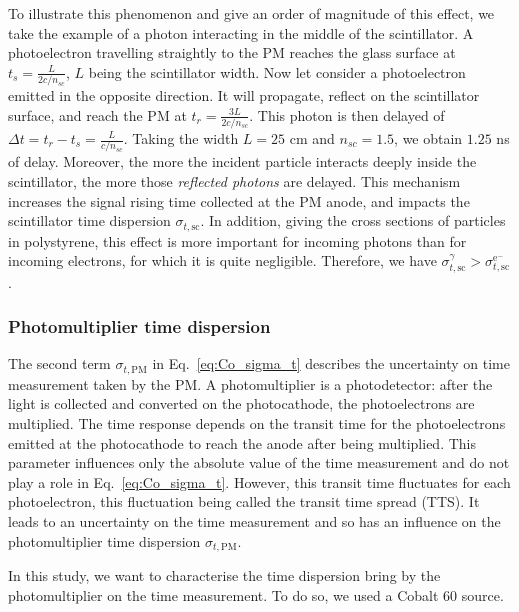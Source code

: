 To illustrate this phenomenon and give an order of magnitude of this effect, we take the example of a photon interacting in the middle of the scintillator.
A photoelectron travelling straightly to the PM reaches the glass surface at $t_{s} = \frac{L}{2c/n_{sc}}$, $L$ being the scintillator width.
Now let consider a photoelectron emitted in the opposite direction.
It will propagate, reflect on the scintillator surface, and reach the PM at $t_{r} = \frac{3L}{2c/n_{sc}}$.
This photon is then delayed of $\Delta t = t_{r} - t_{s} = \frac{L}{c/n_{sc}}$.
Taking the width $L=25$ cm and $n_{sc}=1.5$, we obtain $1.25$ ns of delay.
Moreover, the more the incident particle interacts deeply inside the scintillator, the more those \emph{reflected photons} are delayed.
This mechanism increases the signal rising time collected at the PM anode, and impacts the scintillator time dispersion $\sigma_{t,\text{sc}}$.
In addition, giving the cross sections of particles in polystyrene, this effect is more important for incoming photons than for incoming electrons, for which it is quite negligible.
Therefore, we have $\sigma_{t,\text{sc}}^{\gamma}>\sigma_{t,\text{sc}}^{\text{e}^{-}}$.


\subsubsection*{Photomultiplier time dispersion}

The second term $\sigma_{t,\text{PM}}$ in Eq.~\eqref{eq:Co_sigma_t} describes the uncertainty on time measurement taken by the PM.
A photomultiplier is a photodetector: after the light is collected and converted on the photocathode, the photoelectrons are multiplied.
The time response depends on the transit time for the photoelectrons emitted at the photocathode to reach the anode after being multiplied.
This parameter influences only the absolute value of the time measurement and do not play a role in Eq.~\eqref{eq:Co_sigma_t}.
However, this transit time fluctuates for each photoelectron, this fluctuation being called the transit time spread (TTS).
It leads to an uncertainty on the time measurement and so has an influence on the photomultiplier time dispersion $\sigma_{t,\text{PM}}$.
\newline

In this study, we want to characterise the time dispersion bring by the photomultiplier on the time measurement.
To do so, we used a Cobalt $60$ source.


